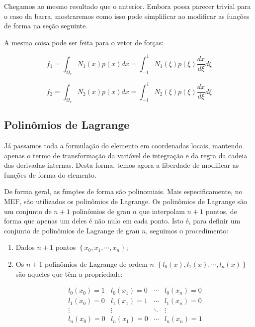         Chegamos ao mesmo resultado que o anterior. Embora possa parecer trivial para o caso da barra, mostraremos como isso pode simplificar ao modificar as funções de forma na seção seguinte.

        A mesma coisa pode ser feita para o vetor de forças:

        \begin{equation*}
            f_{1} = \int_{\Omega_e} N_1(x) p(x) dx = \int_{-1}^1 N_1(\xi) p(\xi) \frac{dx}{d\xi} d\xi
        \end{equation*}

        \begin{equation*}
            f_{2} = \int_{\Omega_e} N_2(x) p(x) dx = \int_{-1}^1 N_2(\xi) p(\xi) \frac{dx}{d\xi} d\xi
        \end{equation*}

    \subsection{Polinômios de Lagrange}
    \label{sec:lagrange}

        Já passamos toda a formulação do elemento em coordenadas locais, mantendo apenas o termo de transformação da variável de integração e da regra da cadeia das derivadas internas. Desta forma, temos agora a liberdade de modificar as funções de forma do elemento.

        De forma geral, as funções de forma são polinomiais. Mais especificamente, no MEF, são utilizados os polinômios de Lagrange. Os polinômios de Lagrange são um conjunto de $n+1$ polinômios de grau $n$ que interpolam $n+1$ pontos, de forma que apenas um deles é não nulo em cada ponto. Isto é, para definir um conjunto de polinômios de Lagrange de grau $n$, seguimos o procedimento:

        
        \begin{enumerate}
            \item Dados $n+1$ pontos $\left\{x_0, x_1, \cdots, x_n\right\}$;
            \item Os $n+1$ polinômios de Lagrange de ordem $n$ $\left\{l_0(x), l_1(x), \cdots, l_n(x)\right\}$ são aqueles que têm a propriedade:
            
            \begin{equation*}
                \begin{array}{cccc}
                    l_0(x_0) = 1 & l_0(x_1) = 0 & \cdots & l_0(x_n) = 0\\
                    l_1(x_0) = 0 & l_1(x_1) = 1 & \cdots & l_1(x_n) = 0\\
                    \vdots & \vdots & \ddots & \vdots\\
                    l_n(x_0) = 0 & l_n(x_1) = 0 & \cdots & l_n(x_n) = 1\\
                \end{array}
            \end{equation*}
        \end{enumerate}

